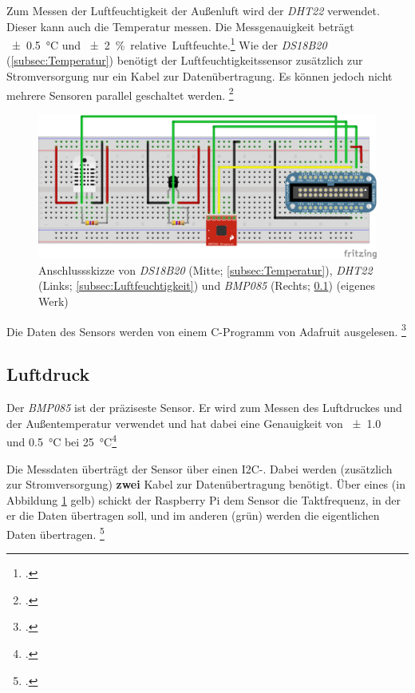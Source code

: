 Zum Messen der Luftfeuchtigkeit der Außenluft wird der \emph{DHT22} verwendet. Dieser kann auch die Temperatur messen. Die Messgenauigkeit beträgt \SI{\pm 0.5}{\degreeCelsius} und \SI{\pm 2}{\% .relative.Luftfeuchte}.\footcite{DHT22}
Wie der \emph{DS18B20} (\ref{subsec:Temperatur}) benötigt der Luftfeuchtigkeitssensor zusätzlich zur Stromversorgung nur ein Kabel zur Datenübertragung. Es können jedoch nicht mehrere Sensoren parallel geschaltet werden. \footcite[Wiring]{DHT}

\begin{figure}
  \centering
     \includegraphics[width=\textwidth]{figures/steckbrett.png}
  \caption{Anschlussskizze von \emph{DS18B20} (Mitte; \ref{subsec:Temperatur}), \emph{DHT22} (Links; \ref{subsec:Luftfeuchtigkeit}) und \emph{BMP085} (Rechts; \ref{subsec:Luftdruck}) (eigenes Werk)}
  \label{fig:steckbrett}
\end{figure}

Die Daten des Sensors werden von einem \gls{C}-Programm von Adafruit ausgelesen.
\footcite[Software Install]{DHT}

\subsection{Luftdruck}
\label{subsec:Luftdruck}

Der \emph{BMP085} ist der präziseste Sensor. Er wird zum Messen des Luftdruckes und der Außentemperatur verwendet und hat dabei eine Genauigkeit von \SI{\pm 1.0}{\hecto{}} und \SI{0.5}{\degreeCelsius} bei \SI{25}{\degreeCelsius}\footcite[6]{BMP085}

Die Messdaten überträgt der Sensor über einen \gls{I2C}-. Dabei werden (zusätzlich zur Stromversorgung) \textbf{zwei} Kabel zur Datenübertragung benötigt.
Über eines (in Abbildung \ref{fig:steckbrett} gelb) schickt der Raspberry Pi dem Sensor die Taktfrequenz, in der er die Daten übertragen soll, und im anderen (grün) werden die eigentlichen Daten übertragen.
\footcite[Hooking Everything Up]{bmp058_adafruit}

